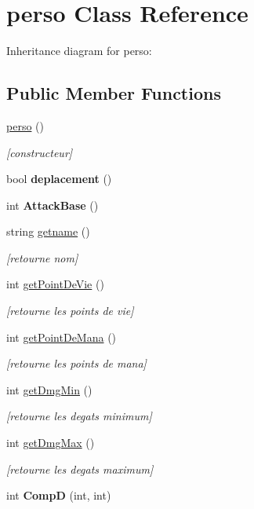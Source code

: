 \hypertarget{classperso}{}\section{perso Class Reference}
\label{classperso}


Inheritance diagram for perso\+:
\subsection*{Public Member Functions}
\begin{DoxyCompactItemize}
\item 
\hyperlink{classperso_af0f49599683fc9a7637ca6e650fbf4aa}{perso} ()
\begin{DoxyCompactList}\small\item\em \mbox{[}constructeur\mbox{]} \end{DoxyCompactList}\item 
bool {\bfseries deplacement} ()\hypertarget{classperso_a33372ddde90782860b58f637a92671f3}{}\label{classperso_a33372ddde90782860b58f637a92671f3}

\item 
int {\bfseries Attack\+Base} ()\hypertarget{classperso_a15178707d38245a7ee5ef87feb6e4cfd}{}\label{classperso_a15178707d38245a7ee5ef87feb6e4cfd}

\item 
string \hyperlink{classperso_a489870c6f4a1a929ce46d02e628ee9ab}{getname} ()
\begin{DoxyCompactList}\small\item\em \mbox{[}retourne nom\mbox{]} \end{DoxyCompactList}\item 
int \hyperlink{classperso_a9391f03615788fb5a66ecf2f7b482c89}{get\+Point\+De\+Vie} ()
\begin{DoxyCompactList}\small\item\em \mbox{[}retourne les points de vie\mbox{]} \end{DoxyCompactList}\item 
int \hyperlink{classperso_aaaa0f1cc177edd679882932937e96037}{get\+Point\+De\+Mana} ()
\begin{DoxyCompactList}\small\item\em \mbox{[}retourne les points de mana\mbox{]} \end{DoxyCompactList}\item 
int \hyperlink{classperso_ade68d24d4ba5af130d7b083d27475097}{get\+Dmg\+Min} ()
\begin{DoxyCompactList}\small\item\em \mbox{[}retourne les degats minimum\mbox{]} \end{DoxyCompactList}\item 
int \hyperlink{classperso_a2e2ad259f19c593468dc0bfecee1a705}{get\+Dmg\+Max} ()
\begin{DoxyCompactList}\small\item\em \mbox{[}retourne les degats maximum\mbox{]} \end{DoxyCompactList}\item 
int {\bfseries CompD} (int, int)\hypertarget{classperso_ae8cd37378a85a88da8921d6d0cf535b0}{}\label{classperso_ae8cd37378a85a88da8921d6d0cf535b0}


\end{DoxyCompactItemize}
